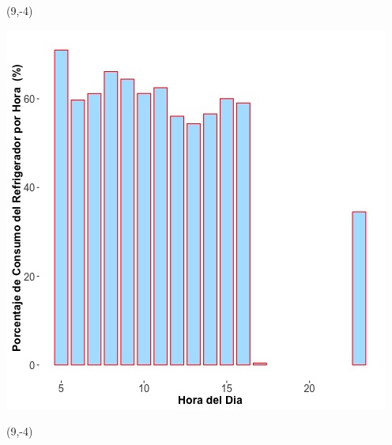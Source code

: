 \documentclass{article}\usepackage[]{graphicx}\usepackage[]{color}
\newenvironment{knitrout}{}{} %
\begin{document}
 \begin{textblock}{1}(9,-4)
\begin{minipage}{20em}
\begingroup

\endgroup
\end{minipage}
\end{textblock}

 \vspace{2cm}

\begin{knitrout}
\color{fgcolor}
\includegraphics[scale=0.65]{figure/A16_fridge_energy_pct.jpg} 
\end{knitrout}

 \begin{textblock}{1}(9,-4)
\begin{minipage}{20em}
\begingroup

\endgroup
\end{minipage}
\end{textblock}
\end{document}
